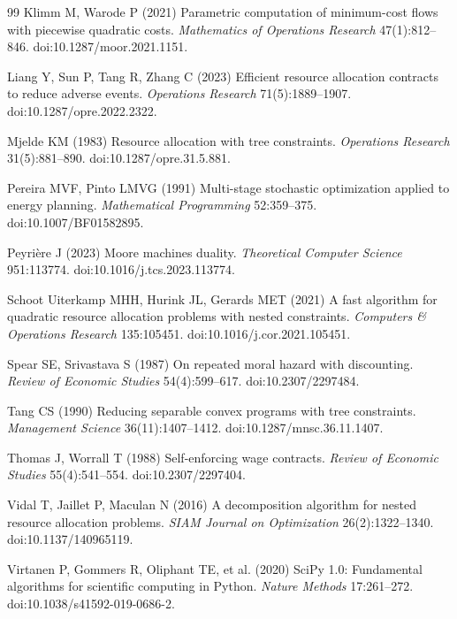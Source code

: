 \begin{thebibliography}{99}
Klimm M, Warode P (2021) Parametric computation of minimum-cost flows with piecewise quadratic costs. \emph{Mathematics of Operations Research} 47(1):812--846. doi:10.1287/moor.2021.1151.

Liang Y, Sun P, Tang R, Zhang C (2023) Efficient resource allocation contracts to reduce adverse events. \emph{Operations Research} 71(5):1889--1907. doi:10.1287/opre.2022.2322.

Mjelde KM (1983) Resource allocation with tree constraints. \emph{Operations Research} 31(5):881--890. doi:10.1287/opre.31.5.881.

Pereira MVF, Pinto LMVG (1991) Multi-stage stochastic optimization applied to energy planning. \emph{Mathematical Programming} 52:359--375. doi:10.1007/BF01582895.

Peyri\`ere J (2023) Moore machines duality. \emph{Theoretical Computer Science} 951:113774. doi:10.1016/j.tcs.2023.113774.

Schoot Uiterkamp MHH, Hurink JL, Gerards MET (2021) A fast algorithm for quadratic resource allocation problems with nested constraints. \emph{Computers \& Operations Research} 135:105451. doi:10.1016/j.cor.2021.105451.

Spear SE, Srivastava S (1987) On repeated moral hazard with discounting. \emph{Review of Economic Studies} 54(4):599--617. doi:10.2307/2297484.

Tang CS (1990) Reducing separable convex programs with tree constraints. \emph{Management Science} 36(11):1407--1412. doi:10.1287/mnsc.36.11.1407.

Thomas J, Worrall T (1988) Self-enforcing wage contracts. \emph{Review of Economic Studies} 55(4):541--554. doi:10.2307/2297404.

Vidal T, Jaillet P, Maculan N (2016) A decomposition algorithm for nested resource allocation problems. \emph{SIAM Journal on Optimization} 26(2):1322--1340. doi:10.1137/140965119.

Virtanen P, Gommers R, Oliphant TE, et al. (2020) SciPy 1.0: Fundamental algorithms for scientific computing in Python. \emph{Nature Methods} 17:261--272. doi:10.1038/s41592-019-0686-2.


\end{thebibliography}
